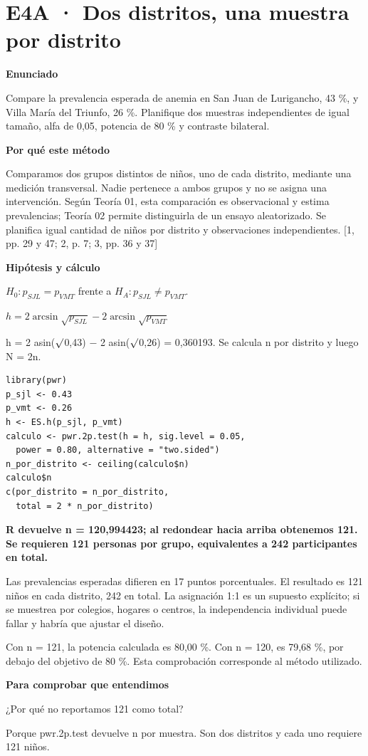 \documentclass[10pt,a4paper]{article}
\newcommand{\etiqueta}[1]{\par{\bfseries\color{Blue}#1}\par}
\newcommand{\cajares}[1]{\par\colorbox{Pale}{\parbox{\dimexpr\linewidth-2\fboxsep}{\vspace{4pt}\textbf{\color{Navy}#1}\vspace{4pt}}}\par}
\begin{document}
\section*{E4A · Dos distritos, una muestra por distrito}
\etiqueta{Enunciado}
Compare la prevalencia esperada de anemia en San Juan de Lurigancho, 43 \%, y Villa María del Triunfo, 26 \%. Planifique dos muestras independientes de igual tamaño, alfa de 0,05, potencia de 80 \% y contraste bilateral.
\etiqueta{Por qué este método}
Comparamos dos grupos distintos de niños, uno de cada distrito, mediante una medición transversal. Nadie pertenece a ambos grupos y no se asigna una intervención. Según Teoría 01, esta comparación es observacional y estima prevalencias; Teoría 02 permite distinguirla de un ensayo aleatorizado. Se planifica igual cantidad de niños por distrito y observaciones independientes. [1, pp. 29 y 47; 2, p. 7; 3, pp. 36 y 37]
\etiqueta{Hipótesis y cálculo}
$H_0:p_{SJL}=p_{VMT}$ frente a $H_A:p_{SJL}\ne p_{VMT}$.

$h=2\arcsin\sqrt{p_{SJL}}-2\arcsin\sqrt{p_{VMT}}$

h = 2 asin(\ensuremath{\surd}0,43) \ensuremath{-} 2 asin(\ensuremath{\surd}0,26) = 0,360193. Se calcula n por distrito y luego N = 2n.
\begin{Verbatim}
library(pwr)
p_sjl <- 0.43
p_vmt <- 0.26
h <- ES.h(p_sjl, p_vmt)
calculo <- pwr.2p.test(h = h, sig.level = 0.05,
  power = 0.80, alternative = "two.sided")
n_por_distrito <- ceiling(calculo$n)
calculo$n
c(por_distrito = n_por_distrito,
  total = 2 * n_por_distrito)
\end{Verbatim}
\cajares{R devuelve n = 120,994423; al redondear hacia arriba obtenemos 121. Se requieren 121 personas por grupo, equivalentes a 242 participantes en total.}
Las prevalencias esperadas difieren en 17 puntos porcentuales. El resultado es 121 niños en cada distrito, 242 en total. La asignación 1:1 es un supuesto explícito; si se muestrea por colegios, hogares o centros, la independencia individual puede fallar y habría que ajustar el diseño.

{\small\color{Gray}Con n = 121, la potencia calculada es 80,00 \%. Con n = 120, es 79,68 \%, por debajo del objetivo de 80 \%. Esta comprobación corresponde al método utilizado.}
\etiqueta{Para comprobar que entendimos}
¿Por qué no reportamos 121 como total?

{\small Porque pwr.2p.test devuelve n por muestra. Son dos distritos y cada uno requiere 121 niños.}
\clearpage
\end{document}
